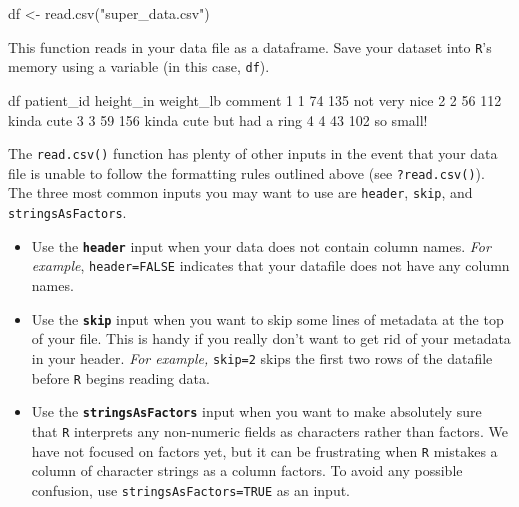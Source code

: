 \documentclass[
]{book}
\newenvironment{Shaded}{\begin{snugshade}}{\end{snugshade}}
\newcommand{\DecValTok}[1]{\textcolor[rgb]{0.00,0.00,0.81}{#1}}
\newcommand{\FunctionTok}[1]{\textcolor[rgb]{0.00,0.00,0.00}{#1}}
\newcommand{\NormalTok}[1]{#1}
\newcommand{\OtherTok}[1]{\textcolor[rgb]{0.56,0.35,0.01}{#1}}
\newcommand{\SpecialCharTok}[1]{\textcolor[rgb]{0.00,0.00,0.00}{#1}}
\newcommand{\StringTok}[1]{\textcolor[rgb]{0.31,0.60,0.02}{#1}}
\begin{document}
\begin{Shaded}
\begin{Highlighting}[]
\NormalTok{df }\OtherTok{\textless{}{-}} \FunctionTok{read.csv}\NormalTok{(}\StringTok{"super\_data.csv"}\NormalTok{)}
\end{Highlighting}
\end{Shaded}

This function reads in your data file as a dataframe. Save your dataset into \texttt{R}'s memory using a variable (in this case, \texttt{df}).

\begin{Shaded}
\begin{Highlighting}[]
\NormalTok{df}
\NormalTok{  patient\_id height\_in weight\_lb                   comment}
\DecValTok{1}          \DecValTok{1}        \DecValTok{74}       \DecValTok{135}\NormalTok{             not very nice}
\DecValTok{2}          \DecValTok{2}        \DecValTok{56}       \DecValTok{112}\NormalTok{                kinda cute}
\DecValTok{3}          \DecValTok{3}        \DecValTok{59}       \DecValTok{156}\NormalTok{ kinda cute but had a ring}
\DecValTok{4}          \DecValTok{4}        \DecValTok{43}       \DecValTok{102}\NormalTok{                 so small}\SpecialCharTok{!}
\end{Highlighting}
\end{Shaded}

The \texttt{read.csv()} function has plenty of other inputs in the event that your data file is unable to follow the formatting rules outlined above (see \texttt{?read.csv()}). The three most common inputs you may want to use are \texttt{header}, \texttt{skip}, and \texttt{stringsAsFactors}.

\begin{itemize}
\item
  Use the \textbf{\texttt{header}} input when your data does not contain column names. \emph{For example}, \texttt{header=FALSE} indicates that your datafile does not have any column names.
\item
  Use the \textbf{\texttt{skip}} input when you want to skip some lines of metadata at the top of your file. This is handy if you really don't want to get rid of your metadata in your header. \emph{For example,} \texttt{skip=2} skips the first two rows of the datafile before \texttt{R} begins reading data.
\item
  Use the \textbf{\texttt{stringsAsFactors}} input when you want to make absolutely sure that \texttt{R} interprets any non-numeric fields as characters rather than factors. We have not focused on factors yet, but it can be frustrating when \texttt{R} mistakes a column of character strings as a column factors. To avoid any possible confusion, use \texttt{stringsAsFactors=TRUE} as an input.
\end{itemize}
\end{document}
